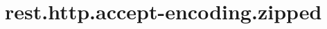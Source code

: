 \section{rest.http.accept-encoding.zipped}
\label{configuration:RestHttpAcceptEncodingZipped}
\AvailableInCsharpOnly{\TODO}